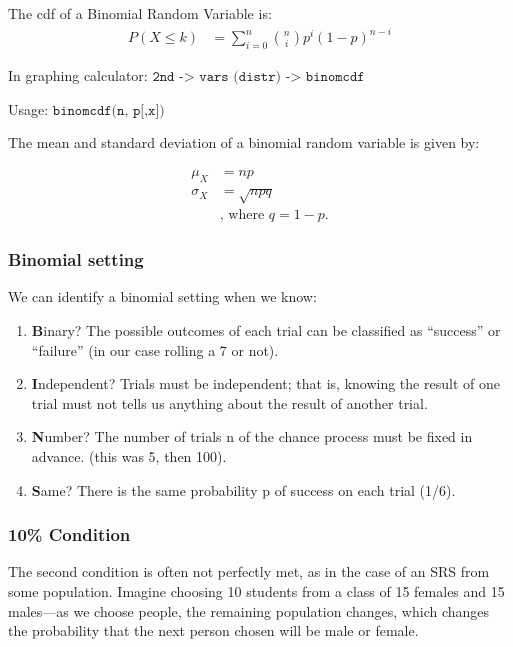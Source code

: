 \documentclass[
]{book}
\begin{document}
The cdf of a Binomial Random Variable is: \[
\begin{aligned}
    P(X\leq k) &= \sum_{i = 0}^n {n \choose i} p^i (1-p)^{n-i}
\end{aligned}
\]

In graphing calculator: \(\texttt{2nd -> vars (distr) -> binomcdf}\)

Usage: \(\texttt{binomcdf(n, p[,x])}\)

The mean and standard deviation of a binomial random variable is given
by:

\[
\begin{aligned}
    \mu_X &= n p \\
    \sigma_X &= \sqrt{n p q} \\
    &\text{, where } q = 1-p.
\end{aligned}
\]

\hypertarget{binomial-setting}{%
\subsubsection{Binomial setting}\label{binomial-setting}}

We can identify a binomial setting when we know:

\begin{enumerate}
\def\labelenumi{\arabic{enumi}.}
\item
  \textbf{B}inary? The possible outcomes of each trial can be classified as
  ``success'' or ``failure'' (in our case rolling a 7 or not).
\item
  \textbf{I}ndependent? Trials must be independent; that is, knowing the
  result of one trial must not tells us anything about the result of
  another trial.
\item
  \textbf{N}umber? The number of trials n of the chance process must be
  fixed in advance. (this was 5, then 100).
\item
  \textbf{S}ame? There is the same probability p of success on each trial
  (1/6).
\end{enumerate}

\hypertarget{condition}{%
\subsubsection{10\% Condition}\label{condition}}

The second condition is often not perfectly met, as in the case of an
SRS from some population. Imagine choosing 10 students from a class of
15 females and 15 males---as we choose people, the remaining population
changes, which changes the probability that the next person chosen will
be male or female.
\end{document}
